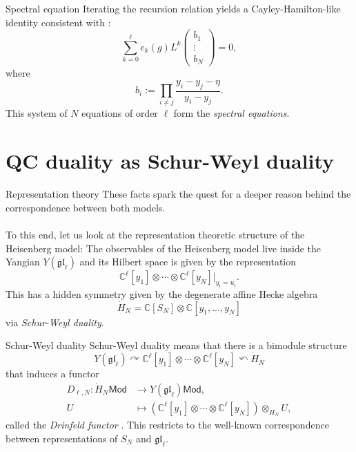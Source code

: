\documentclass[11pt]{beamer}
\theoremstyle{remark}
\theoremstyle{remark}
\newcommand{\C}{\mathbb{C}}
\begin{document}
\begin{frame}{Spectral equation}
Iterating the recursion relation %
yields a Cayley-Hamilton-like identity consistent with \cite{article:gorsky:2014}:
\begin{equation*}
\sum_{k=0}^\ell e_k(g) L^k
\begin{pmatrix}
b_1 \\ \vdots \\ b_N
\end{pmatrix}
= 0,
\end{equation*}
where
\begin{equation*}
b_i := \prod_{i \neq j} \frac{y_i-y_j-\eta}{y_i-y_j}.
\end{equation*}
This system of $N$ equations of order $\ell$ form the \emph{spectral equations}.
\end{frame}

\section{QC duality as Schur-Weyl duality}

\begin{frame}{Representation theory}
These facts spark the quest for a deeper reason behind the correspondence between both models.
\\~\\
To this end, let us look at the representation theoretic structure of the Heisenberg model: The observables of the Heisenberg model live inside the Yangian $Y(\mathfrak{gl}_\ell)$ and its Hilbert space is given by the representation
\begin{equation*}
\C^\ell[y_1] \otimes \cdots \otimes \C^\ell[y_N]|_{y_i=u_i}.
\end{equation*}
This has a hidden symmetry given by the degenerate affine Hecke algebra
\begin{equation*}
\dot H_N = \C[S_N] \otimes \C[y_1,...,y_N]
\end{equation*}
via \emph{Schur-Weyl duality}.
\end{frame}

\begin{frame}{Schur-Weyl duality}
Schur-Weyl duality means that there is a bimodule structure
\begin{equation*}
Y(\mathfrak{gl}_\ell) \curvearrowright \C^\ell[y_1] \otimes \cdots \otimes \C^\ell[y_N] \curvearrowleft \dot H_N
\end{equation*}
that induces a functor
\begin{align*}
D_{\ell,N}: \dot H_N\mathsf{Mod} &\to Y(\mathfrak{gl}_\ell)\mathsf{Mod}, \\
U &\mapsto  (\C^\ell[y_1] \otimes \cdots \otimes \C^\ell[y_N]) \otimes_{\dot H_N} U,
\end{align*}
called the \emph{Drinfeld functor} \cite{article:drinfeld:1986}. This restricts to the well-known correspondence between representations of $S_N$ and $\mathfrak{gl}_\ell$.
\end{frame}
\end{document}
